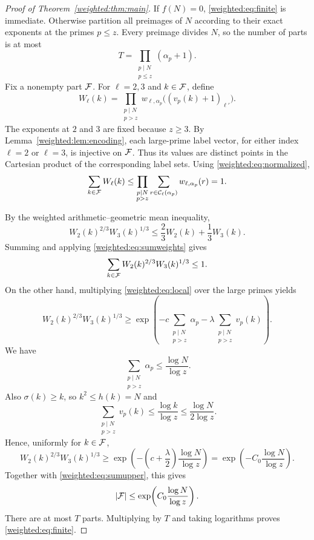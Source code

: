 \begin{proof}[Proof of Theorem~\ref{weighted:thm:main}]
If $f(N)=0$, \eqref{weighted:eq:finite} is immediate. Otherwise partition all preimages of $N$ according to their exact exponents at the primes $p\le z$. Every preimage divides $N$, so the number of parts is at most
\[
T=\prod_{\substack{p\mid N\\p\le z}}(\alpha_p+1).
\]
Fix a nonempty part $\mathcal F$. For $\ell=2,3$ and $k\in\mathcal F$, define
\[
W_\ell(k)=\prod_{\substack{p\mid N\\p>z}}
 w_{\ell,\alpha_p}\bigl((v_p(k)+1)_{\ell'}\bigr).
\]
The exponents at $2$ and $3$ are fixed because $z\ge3$. By Lemma~\ref{weighted:lem:encoding}, each large-prime label vector, for either index $\ell=2$ or $\ell=3$, is injective on $\mathcal F$. Thus its values are distinct points in the Cartesian product of the corresponding label sets. Using \eqref{weighted:eq:normalized},
\begin{equation}\label{weighted:eq:sumweights}
\sum_{k\in\mathcal F}W_\ell(k)
\le\prod_{\substack{p\mid N\\p>z}}
   \sum_{r\in\mathcal C_\ell(\alpha_p)}w_{\ell,\alpha_p}(r)
=1.
\end{equation}

By the weighted arithmetic--geometric mean inequality,
\[
W_2(k)^{2/3}W_3(k)^{1/3}
\le\frac23W_2(k)+\frac13W_3(k).
\]
Summing and applying \eqref{weighted:eq:sumweights} gives
\begin{equation}\label{weighted:eq:sumupper}
\sum_{k\in\mathcal F}W_2(k)^{2/3}W_3(k)^{1/3}\le1.
\end{equation}
On the other hand, multiplying \eqref{weighted:eq:local} over the large primes yields
\[
W_2(k)^{2/3}W_3(k)^{1/3}
\ge\exp\!\left(-c\sum_{\substack{p\mid N\\p>z}}\alpha_p
                 -\lambda\sum_{\substack{p\mid N\\p>z}}v_p(k)\right).
\]
We have
\[
\sum_{\substack{p\mid N\\p>z}}\alpha_p
\le\frac{\log N}{\log z}.
\]
Also $\sigma(k)\ge k$, so $k^2\le h(k)=N$ and
\[
\sum_{\substack{p\mid N\\p>z}}v_p(k)
\le\frac{\log k}{\log z}
\le\frac{\log N}{2\log z}.
\]
Hence, uniformly for $k\in\mathcal F$,
\[
W_2(k)^{2/3}W_3(k)^{1/3}
\ge\exp\!\left(-\left(c+\frac\lambda2\right)
                       \frac{\log N}{\log z}\right)
=\exp\!\left(-C_0\frac{\log N}{\log z}\right).
\]
Together with \eqref{weighted:eq:sumupper}, this gives
\[
|\mathcal F|\le\exp\!\left(C_0\frac{\log N}{\log z}\right).
\]
There are at most $T$ parts. Multiplying by $T$ and taking logarithms proves \eqref{weighted:eq:finite}.


\end{proof}
